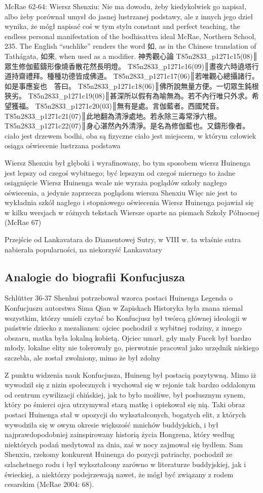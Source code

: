 McRae 62-64:
Wiersz Shenxiu:
Nie ma dowodu, żeby kiedykolwiek go napisał, albo żeby porównał umysł do jasnej lustrzanej podstawy, ale z innych jego dzieł wynika, że mógł napisać coś w tym stylu
constant and perfect teaching, the endless personal manifestation of the
bodhisattva ideal
McRae, Northern School, 235. The English “suchlike” renders the word 如, as in the Chinese translation of Tathágata, 如來, when used as a modifier.
神秀觀心論
T85n2833_p1271c15(08)║眾生修伽藍鑄形像燒香散花然長明燈。
T85n2833_p1271c16(09)║晝夜六時遶塔行道持齋禮拜。種種功德皆成佛道。
T85n2833_p1271c17(06)║若唯觀心總攝諸行。如是事應妄也　答曰。
T85n2833_p1271c18(06)║佛所說無量方便。一切眾生鈍根狹劣。
T85n2833_p1271c19(08)║甚深所以假有為喻無為。若不內行唯只外求。希望獲福。
T85n2833_p1271c20(03)║無有是處。言伽藍者。西國梵音。
T85n2833_p1271c21(07)║此地翻為清淨處地。若永除三毒常淨六根。
T85n2833_p1271c22(07)║身心湛然內外清淨。是名為修伽藍也。又鑄形像者。
ciało jest drzewem bodhi, oba są fizyczne
ciało jest miejscem, w którym człowiek osiąga oświecenie
lustrzana podstawa

Wiersz Shenxiu był głęboki i wyrafinowany, bo tym sposobem wiersz Huinenga jest lepszy od czegoś wybitnego; być lepszym od czegoś miernego to żadne osiągnięcie
Wiersz Huinenga wcale nie wyraża poglądów szkoły nagłego oświecenia, a jedynie zaprzecza poglądom wiersza Shenxiu
Więc nie jest to wykładnia szkół nagłego i stopniowego oświecenia
Wiersz Huinenga pojawiał się w kilku wersjach w różnych tekstach
Wiersze oparte na pismach Szkoły Północnej (McRae 67)

Przejście od Lankavatara do Diamentowej Sutry, w VIII w. ta właśnie sutra nabierała popularności, na niekorzyść Lankavatary
\fi
\subsection{Analogie do biografii Konfucjusza}
Schlütter 36-37
Shenhui potrzebował wzorca postaci Huinenga
Legenda o Konfucjuszu autorstwa Sima Qian w Zapiskach Historyka
była znana niemal wszystkim, którzy umieli czytać
bo Konfucjusz był twórcą głównej ideologii w państwie
dziecko z mezaliansu: ojciec pochodził z wybitnej rodziny, z innego obszaru, matka była lokalną kobietą. Ojciec umarł, gdy mały Fucek był bardzo młody. lokalne elity nie tolerowały go, pierwotnie pracował jako urzędnik niskiego szczebla, ale został zwolniony, mimo że był zdolny

Z punktu widzenia nauk Konfucjusza, Huineng był postacią pozytywną. Mimo iż wywodził się z nizin społecznych i wychował się w rejonie tak bardzo oddalonym od centrum cywilizacji chińskiej, jak to było możliwe, był posłusznym synem, który po śmierci ojca utrzymywał starą matkę i opiekował się nią. Taki obraz postaci Huinenga stał w opozycji do wykształconych, bogatych elit, z których wywodziła się w owym okresie większość mnichów buddyjskich, i był najprawdopodobniej zainspirowany historią życia Hongrena, który według niektórych podań medytował za dnia, zaś w nocy zajmował się bydłem. Sam Shenxiu, rzekomy konkurent Huinenga do pozycji patriachy, pochodził ze szlachetnego rodu i był wykształcony zarówno w literaturze buddyjskiej, jak i świeckiej, a niektórzy podejrzewają nawet, że mógł być związany z rodem cesarskim (McRae 2004: 68).

